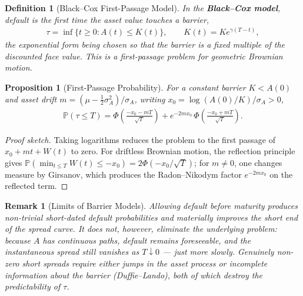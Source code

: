 \documentclass{report}
\theoremstyle{spacedplain}
\newtheorem{proposition}[theorem]{Proposition}
\theoremstyle{spaceddefinition}
\newtheorem{definition}[theorem]{Definition}
\theoremstyle{spacedremark}
\newtheorem{remark}[theorem]{Remark}
\begin{document}
\begin{definition}[Black--Cox First-Passage Model]
    In the \textbf{Black--Cox model}, default is the first time the asset value touches a barrier,
    \begin{align}
        \tau = \inf\{t\geq 0 : A(t) \leq K(t)\}, \qquad K(t) = Ke^{\gamma(T-t)},
    \end{align}
    the exponential form being chosen so that the barrier is a fixed multiple of the discounted face value. This is a first-passage problem for geometric Brownian motion.
\end{definition}

\begin{proposition}[First-Passage Probability]
    For a constant barrier $K < A(0)$ and asset drift $m = (\mu - \tfrac12\sigma_A^2)/\sigma_A$, writing $x_0 = \log(A(0)/K)/\sigma_A > 0$,
    \begin{align}
        \mathbb{P}(\tau \leq T) = \Phi\!\left(\frac{-x_0 - mT}{\sqrt{T}}\right) + e^{-2mx_0}\,\Phi\!\left(\frac{-x_0 + mT}{\sqrt{T}}\right).
    \end{align}
\end{proposition}
\begin{proof}[Proof sketch]
    Taking logarithms reduces the problem to the first passage of $x_0 + mt + W(t)$ to zero. For driftless Brownian motion, the reflection principle gives $\mathbb{P}(\min_{t\leq T} W(t) \leq -x_0) = 2\Phi(-x_0/\sqrt{T})$; for $m \neq 0$, one changes measure by Girsanov, which produces the Radon--Nikodym factor $e^{-2mx_0}$ on the reflected term.
\end{proof}

\begin{remark}[Limits of Barrier Models]
    Allowing default before maturity produces non-trivial short-dated default probabilities and materially improves the short end of the spread curve. It does not, however, eliminate the underlying problem: because $A$ has continuous paths, default remains \emph{foreseeable}, and the instantaneous spread still vanishes as $T\downarrow 0$ --- just more slowly. Genuinely non-zero short spreads require either jumps in the asset process or incomplete information about the barrier (Duffie--Lando), both of which destroy the predictability of $\tau$.
\end{remark}
\end{document}
